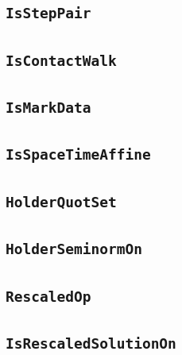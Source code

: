\documentclass[11pt]{amsart}
\theoremstyle{definition}
\begin{document}
\subsection{\texorpdfstring{\texttt{IsStepPair}}{IsStepPair}}\label{node:IsStepPair}


\subsection{\texorpdfstring{\texttt{IsContactWalk}}{IsContactWalk}}\label{node:IsContactWalk}


\subsection{\texorpdfstring{\texttt{IsMarkData}}{IsMarkData}}\label{node:IsMarkData}


\subsection{\texorpdfstring{\texttt{IsSpaceTimeAffine}}{IsSpaceTimeAffine}}\label{node:IsSpaceTimeAffine}


\subsection{\texorpdfstring{\texttt{HolderQuotSet}}{HolderQuotSet}}\label{node:HolderQuotSet}


\subsection{\texorpdfstring{\texttt{HolderSeminormOn}}{HolderSeminormOn}}\label{node:HolderSeminormOn}


\subsection{\texorpdfstring{\texttt{RescaledOp}}{RescaledOp}}\label{node:RescaledOp}


\subsection{\texorpdfstring{\texttt{IsRescaledSolutionOn}}{IsRescaledSolutionOn}}\label{node:IsRescaledSolutionOn}

\end{document}
